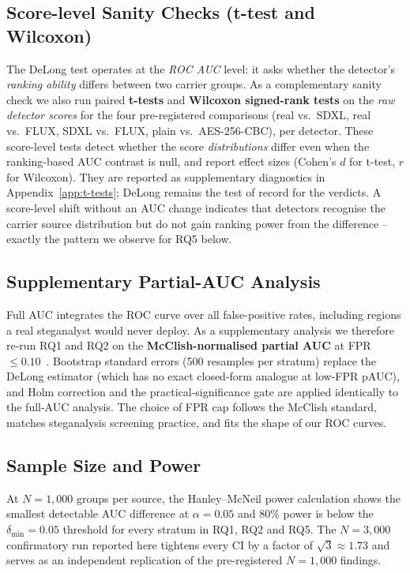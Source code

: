 \documentclass[10pt,twocolumn,a4paper]{article}
\begin{document}
\subsection{Score-level Sanity Checks (t-test and Wilcoxon)}
\label{sec:scorelevel}
The DeLong test operates at the \emph{ROC AUC} level: it asks whether the detector's \emph{ranking ability} differs between two carrier groups. As a complementary sanity check we also run paired \textbf{t-tests} and \textbf{Wilcoxon signed-rank tests} on the \emph{raw detector scores} for the four pre-registered comparisons (real vs.\ SDXL, real vs.\ FLUX, SDXL vs.\ FLUX, plain vs.\ AES-256-CBC), per detector. These score-level tests detect whether the score \emph{distributions} differ even when the ranking-based AUC contrast is null, and report effect sizes (Cohen's $d$ for t-test, $r$ for Wilcoxon). They are reported as supplementary diagnostics in Appendix~\ref{app:t-tests}; DeLong remains the test of record for the verdicts. A score-level shift without an AUC change indicates that detectors recognise the carrier source distribution but do not gain ranking power from the difference -- exactly the pattern we observe for RQ5 below.

\subsection{Supplementary Partial-AUC Analysis}
\label{sec:pauc}

Full AUC integrates the ROC curve over all false-positive rates, including regions a real steganalyst would never deploy. As a supplementary analysis we therefore re-run RQ1 and RQ2 on the \textbf{McClish-normalised partial AUC} at FPR\,$\leq\!0.10$~\cite{mcclish1989}. Bootstrap standard errors (500 resamples per stratum) replace the DeLong estimator (which has no exact closed-form analogue at low-FPR pAUC), and Holm correction and the practical-significance gate are applied identically to the full-AUC analysis. The choice of FPR cap follows the McClish standard, matches steganalysis screening practice, and fits the shape of our ROC curves.

\subsection{Sample Size and Power}

At $N\!=\!1{,}000$ groups per source, the Hanley--McNeil power calculation shows the smallest detectable AUC difference at $\alpha\!=\!0.05$ and $80\%$ power is below the $\delta_\text{min}\!=\!0.05$ threshold for every stratum in RQ1, RQ2 and RQ5. The $N\!=\!3{,}000$ confirmatory run reported here tightens every CI by a factor of $\sqrt{3}\!\approx\!1.73$ and serves as an independent replication of the pre-registered $N\!=\!1{,}000$ findings.
\end{document}
